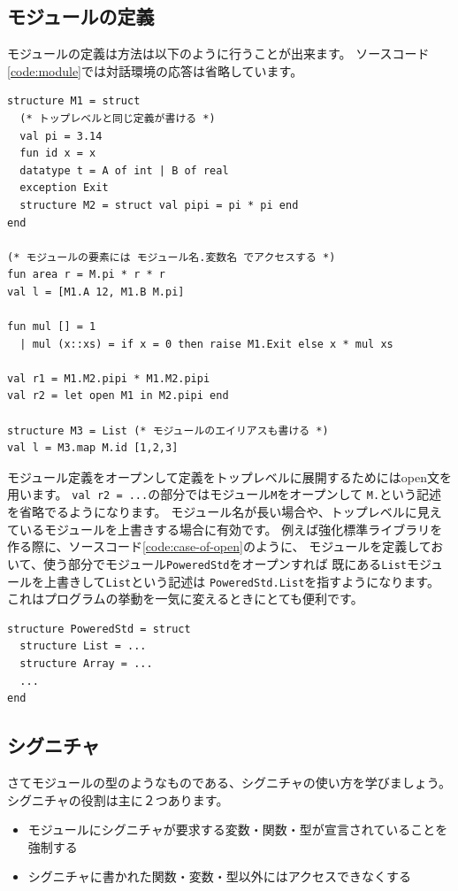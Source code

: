 \documentclass[11pt,a4paper]{article}
\begin{document}
\subsection{モジュールの定義}

モジュールの定義は方法は以下のように行うことが出来ます。
ソースコード\ref{code:module}では対話環境の応答は省略しています。

\begin{lstlisting}[caption=モジュールの定義,label=code:module]
structure M1 = struct
  (* トップレベルと同じ定義が書ける *)
  val pi = 3.14
  fun id x = x
  datatype t = A of int | B of real
  exception Exit
  structure M2 = struct val pipi = pi * pi end
end

(* モジュールの要素には モジュール名.変数名 でアクセスする *)
fun area r = M.pi * r * r
val l = [M1.A 12, M1.B M.pi]

fun mul [] = 1
  | mul (x::xs) = if x = 0 then raise M1.Exit else x * mul xs

val r1 = M1.M2.pipi * M1.M2.pipi
val r2 = let open M1 in M2.pipi end

structure M3 = List (* モジュールのエイリアスも書ける *)
val l = M3.map M.id [1,2,3]
\end{lstlisting}

モジュール定義をオープンして定義をトップレベルに展開するためにはopen文を用います。
\lstinline{val r2 = ...}の部分ではモジュール\lstinline{M}をオープンして
\lstinline{M.}という記述を省略でるようになります。
モジュール名が長い場合や、トップレベルに見えているモジュールを上書きする場合に有効です。
例えば強化標準ライブラリを作る際に、ソースコード\ref{code:case-of-open}のように、
モジュールを定義しておいて、使う部分でモジュール\lstinline{PoweredStd}をオープンすれば
既にある\lstinline{List}モジュールを上書きして\lstinline{List}という記述は
\lstinline{PoweredStd.List}を指すようになります。
これはプログラムの挙動を一気に変えるときにとても便利です。

\begin{lstlisting}[caption=openの使いドコロ,label=code:case-of-open]
structure PoweredStd = struct
  structure List = ...
  structure Array = ...
  ...
end
\end{lstlisting}

\subsection{シグニチャ}

さてモジュールの型のようなものである、シグニチャの使い方を学びましょう。
シグニチャの役割は主に２つあります。
\begin{itemize}
\item モジュールにシグニチャが要求する変数・関数・型が宣言されていることを強制する
\item シグニチャに書かれた関数・変数・型以外にはアクセスできなくする
\end{itemize}
\end{document}
